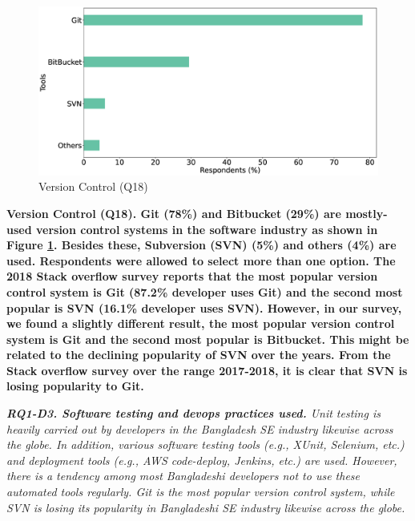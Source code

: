 \begin{figure}[h]
\centering
  \includegraphics[scale=0.16]{Figures/Respondents_version_control}
  \caption{Version Control (Q18)}
  \label{fig:versionControl}
\end{figure}
\bf{Version Control (Q18).} Git (78\%) and Bitbucket (29\%) are mostly-used
version control systems in the software industry as shown in Figure
\ref{fig:versionControl}. Besides these, Subversion (SVN) (5\%) and others (4\%)
are used.  Respondents were allowed to select more than one option. The 2018
Stack overflow survey\citep{StackoverflowSurvey2018} reports that the most
popular version control system is Git (87.2\% developer uses Git) and the second
most popular is SVN (16.1\% developer uses SVN). However, in our survey, we
found a slightly different result, the most popular version control system is
Git and the second most popular is Bitbucket. This might be related to the
declining popularity of SVN over the years. From the Stack overflow survey over
the range 2017-2018, it is clear that SVN is losing popularity to Git. 

\begin{tcolorbox}[flushleft upper,boxrule=1pt,arc=0pt,left=0pt,right=0pt,top=0pt,bottom=0pt,colback=white,after=\ignorespacesafterend\par\noindent]
\nd\it{\bf{RQ1-D3. Software testing and devops practices used.}} Unit testing is
heavily carried out by developers in the Bangladesh SE industry likewise across
the globe. In addition, various software testing
tools (e.g., XUnit, Selenium, etc.) and deployment tools (e.g., AWS code-deploy,
Jenkins, etc.) are used. However, there is a tendency among most
Bangladeshi developers not to use these automated tools regularly. 
Git is the most popular version control system, while SVN is losing
its popularity in Bangladeshi SE industry likewise across the globe.
\end{tcolorbox}
